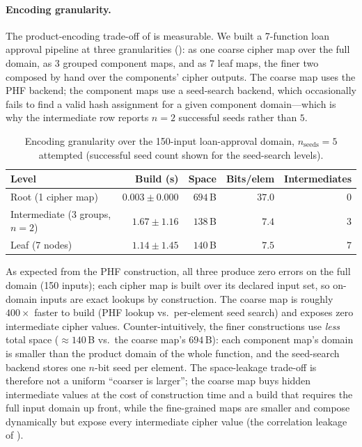 \documentclass[11pt]{article}
\theoremstyle{definition}
\theoremstyle{plain}
\theoremstyle{remark}
\begin{document}
\paragraph{Encoding granularity.}
The product-encoding trade-off of  is measurable.
We built a 7-function loan approval pipeline at three granularities
(): as one coarse cipher map over the full domain,
as $3$ grouped component maps, and as $7$ leaf maps, the finer two
composed by hand over the components' cipher outputs.
The coarse map uses the PHF backend; the component maps use a
seed-search backend, which occasionally fails to find a valid hash
assignment for a given component domain---which is why the intermediate
row reports $n = 2$ successful seeds rather than $5$.

\begin{table}[ht]
\centering
\small
\caption{Encoding granularity over the 150-input loan-approval
domain, $n_\text{seeds} = 5$ attempted (successful seed count
shown for the seed-search levels).}
\label{tab:granularity}
\begin{tabular}{@{}lrrrr@{}}
\toprule
Level & Build (s) & Space & Bits/elem & Intermediates \\
\midrule
Root (1 cipher map) & $0.003 \pm 0.000$ & $694$\,B & $37.0$ & $0$ \\
Intermediate (3 groups, $n = 2$) & $1.67 \pm 1.16$ & $138$\,B & $7.4$ & $3$ \\
Leaf (7 nodes) & $1.14 \pm 1.45$ & $140$\,B & $7.5$ & $7$ \\
\bottomrule
\end{tabular}
\end{table}

As expected from the PHF construction, all three produce zero errors
on the full domain (150 inputs); each cipher map is built over its
declared input set, so on-domain inputs are exact lookups by
construction.
The coarse map is roughly $400\times$ faster to build (PHF lookup vs.\
per-element seed search) and exposes zero intermediate cipher values.
Counter-intuitively, the finer constructions use \emph{less} total
space ($\approx 140$\,B vs.\ the coarse map's $694$\,B): each component
map's domain is smaller than the product domain of the whole function,
and the seed-search backend stores one $n$-bit seed per element.
The space-leakage trade-off is therefore not a uniform ``coarser is
larger''; the coarse map buys hidden intermediate values at the cost of
construction time and a build that requires the full input domain up
front, while the fine-grained maps are smaller and compose dynamically
but expose every intermediate cipher value (the correlation leakage of
\Cref{prop:product-tradeoff}).
\end{document}
